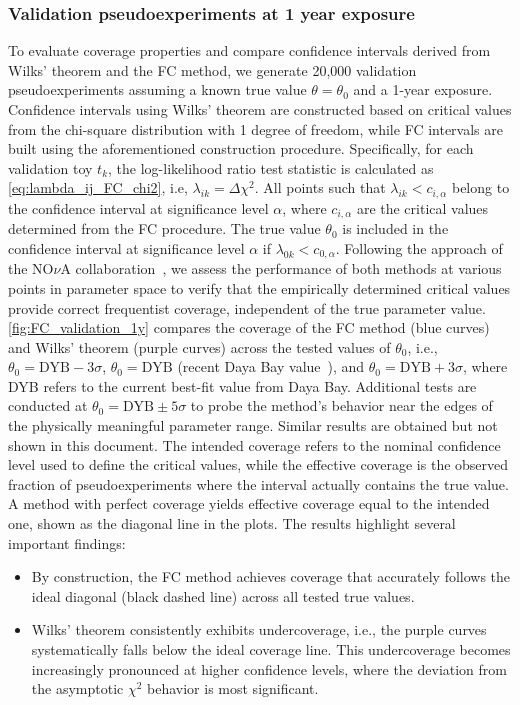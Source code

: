 \subsubsection{Validation pseudoexperiments at 1 year exposure}
To evaluate coverage properties and compare confidence intervals derived from Wilks' theorem and the FC method, we generate 20,000 validation pseudoexperiments assuming a known true value $\theta = \theta_0$ and a 1-year exposure. Confidence intervals using Wilks' theorem are constructed based on critical values from the chi-square distribution with 1 degree of freedom, while FC intervals are built using the aforementioned construction procedure. Specifically, for each validation toy $t_k$, the log-likelihood ratio test statistic is calculated as \autoref{eq:lambda_ij_FC_chi2}, i.e, $\lambda_{ik} = \Delta\chi^2$. All points such that $\lambda_{ik} < c_{i,\alpha}$ belong to the confidence interval at significance level $\alpha$, where $c_{i,\alpha}$ are the critical values determined from the FC procedure. The true value $\theta_0$ is included in the confidence interval at significance level $\alpha$ if $\lambda_{0k} < c_{0,\alpha}$.
Following the approach of the NO$\nu$A collaboration~\cite{NOvA:2022wnj}, we assess the performance of both methods at various points in parameter space to verify that the empirically determined critical values provide correct frequentist coverage, independent of the true parameter value. 
\autoref{fig:FC_validation_1y} compares the coverage of the FC method (blue curves) and Wilks’ theorem (purple curves) across the tested values of $\theta_0$, i.e., $\theta_0 = \text{DYB} - 3\sigma$, $\theta_0 = \text{DYB}$ (recent Daya Bay value~\cite{DayaBay:2022orm}), and $\theta_0 = \text{DYB} + 3\sigma$, where DYB refers to the current best-fit value from Daya Bay. Additional tests are conducted at $\theta_0 = \text{DYB} \pm 5\sigma$ to probe the method's behavior near the edges of the physically meaningful parameter range. Similar results are obtained but not shown in this document. The intended coverage refers to the nominal confidence level used to define the critical values, while the effective coverage is the observed fraction of pseudoexperiments where the interval actually contains the true value. A method with perfect coverage yields effective coverage equal to the intended one, shown as the diagonal line in the plots. The results highlight several important findings:
\begin{itemize}
    \item By construction, the FC method achieves coverage that accurately follows the ideal diagonal (black dashed line) across all tested true values.
    \item Wilks' theorem consistently exhibits undercoverage, i.e., the purple curves systematically falls below the ideal coverage line. This undercoverage becomes increasingly pronounced at higher confidence levels, where the deviation from the asymptotic $\chi^2$ behavior is most significant.
\end{itemize}

